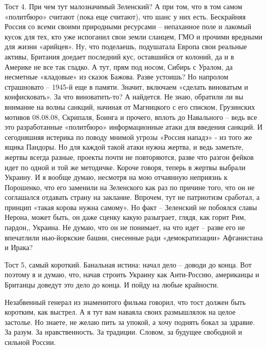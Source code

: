 Тост 4. При чем тут малозначимый Зеленский? А при том, что в том самом
«политбюро» считают (пока еще считают), что шанс у них есть. Бескрайняя Россия
со всеми своими природными ресурсами – непаханное поле и лакомый кусок для тех,
кто уже испоганил свои земли сланцем, ГМО и прочими вредными для жизни
«арийцев». Ну, что поделаешь, подушатала Европа свои реальные активы, Британия
доедает последний кус, оставшийся от колоний, да и в Америке не все так гладко.
А тут, прям под носом, Сибирь с Уралом, да несметные «кладовые» из сказок
Бажова. Разве устоишь? Но напролом страшновато – 1945-й еще в памяти. Значит,
включаем «сделать виноватым и конфисковать». За что виноватить-то? А найдется.
Не знаю, обратили ли вы внимание на волны санкций, начиная от Магницкого с его
списком, Грузинских мотивов 08.08.08, Скрипаля, Боинга и прочего, вплоть до
Навального – ведь все это разработанные «политбюро» информационные атаки для
введения санкций. И сегодняшняя истерика по поводу мнимой угрозы «Россия
нападэ» - из того же ящика Пандоры. Но для каждой такой атаки нужна жертва, и
ведь заметьте, жертвы всегда разные, проекты почти не повторяются, разве что
разгон фейков идет по одной и той же методичке. Короче говоря, теперь в жертвы
выбрали Украину. И я вообще думаю, несмотря на мою отчаянную неприязнь к
Порошенко, что его заменили на Зеленского как раз по причине того, что он не
соглашался отдавать страну на заклание. Впрочем, тут не патриотизм сработал, а
принцип «такая корова нужна самому». Но факт – Зеленский не побоялся славы
Нерона, может быть, он даже сценку какую разыграет, глядя, как горит Рим,
пардон,, Украина. Не думаю, что он не понимает, на что идет – разве его не
впечатлили нью-йоркские башни, снесенные ради «демократизации» Афганистана и
Ирака?

Тост 5, самый короткий. Банальная истина: начал дело – доводи до конца. Вот
поэтому я и думаю, что, начав строить Украину как Анти-Россию, американцы и
Британцы доведут это дело до конца. И пойду на любые крайности.

Незабвенный генерал из знаменитого фильма говорил, что тост должен быть
коротким, как выстрел. А я тут вам наваяла своих размышлялок на целое застолье.
Но знаете, не желаю пить за упокой, а хочу поднять бокал за здравие. За разум.
За нравственность. За традиции. Словом, за будущее свободной и сильной России.
